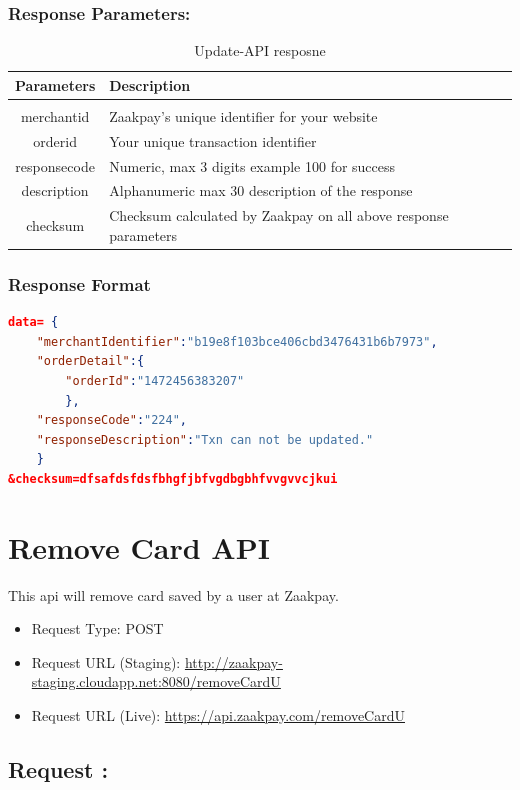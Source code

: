 \documentclass{article}
\begin{document}
\subsubsection{Response Parameters:}
\begin{longtable}{||c||p{12.5cm}||}
\caption{Update-API resposne}\\
    \rowcolor{green!50}
\bfseries{Parameters} & \bfseries{Description} \\ \hline
 & \\
merchantid & Zaakpay's unique identifier for your website \\
orderid & Your unique transaction identifier\\
responsecode & Numeric, max 3 digits example 100 for success \\
description &Alphanumeric max 30 description of the response \\
checksum &Checksum calculated by Zaakpay on all above response parameters \\


\end{longtable}

\subsubsection{Response Format}

\begin{lstlisting}[language=json,breaklines=true]
data= {
	"merchantIdentifier":"b19e8f103bce406cbd3476431b6b7973",
	"orderDetail":{
		"orderId":"1472456383207"
		},
	"responseCode":"224",
	"responseDescription":"Txn can not be updated."
    }
&checksum=dfsafdsfdsfbhgfjbfvgdbgbhfvvgvvcjkui 
\end{lstlisting}

\newpage
\section{Remove Card API}
This api will remove card saved by a user at Zaakpay. \\
\begin{itemize}
\item Request Type: POST
\item Request URL (Staging): \url{http://zaakpay-staging.cloudapp.net:8080/removeCardU}
\item Request URL (Live): \url{https://api.zaakpay.com/removeCardU}
\end{itemize}
\subsection{Request :}
\end{document}
